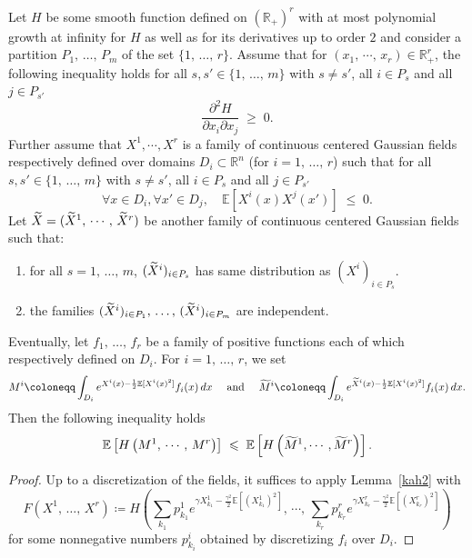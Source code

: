 \documentclass[10pt]{amsart}
\theoremstyle{definition}\newtheorem{defi}[theo]{Definition}\newtheorem{rema}[theo]{Remark}\newtheorem{exam}[theo]{Example}\newtheorem{exem}[theo]{Example}\newtheorem{nota}[theo]{Notation}
\renewcommand{\tilde}{\widetilde}
\renewcommand{\leq}{\;\leqslant\;}
\renewcommand{\geq}{\;\geqslant\;}
\newcommand{\R}{\mathbb{R}}
\newcommand{\E}{\mathbb{E}}
\newcommand*\green[1]{#1}
\let\oldtilde\tilde
\renewcommand*{\tilde}[1]{\mathchoice{\widetilde{#1}}{\widetilde{#1}}{\oldtilde{#1}}{\oldtilde{#1}}}
\let\oldforall\forall
\renewcommand*{\forall}{\mathrel{\oldforall}}
\begin{document}
\begin{coro}\label{comparison}
Let $H$ be some smooth function defined on $(\R_+)^{r}$ with at most polynomial growth at infinity for $H$ as well as for its derivatives up to order $2$ and consider a partition $P_1,\,\dots,\,P_m$ of the set $\{1,\,\dots,\,r\}$. Assume that for $(x_1,\,\cdots,\,x_{r}) \in \R_+^{r}$, the following inequality holds for all $s,s'\in \{1,\,\dots,\,m\}$ with $s\not=s'$, all $i\in P_{s}$ and all $j\in P_{s'}$
\begin{equation*}
\frac{\partial^2 H}{\partial x_i \partial x_j } \geq 0.
\end{equation*}
Further assume that $X^1, \cdots, X^{\green r}$ is a family of continuous centered Gaussian fields respectively defined over domains $D_i\subset \R^n$ (for $i=1,\,\dots,\,{r}$) such that for all $ s,s'\in \{1,\,\dots,\,m\}$ with $s\not=s'$, all $i\in P_{s}$ and all $j\in P_{s'}$
\begin{equation*}
\forall x\in D_i,\forall x'\in D_j,\quad \E[X^i(x) X^j(x')] \leq 0.
\end{equation*}
Let $\tilde{X}=(\tilde{X}^1,\,\cdots,\,\tilde{X}^{r})$ be another family of continuous centered Gaussian fields such that:
\begin{enumerate}
\item for all $ s=1,\,\dots,\,m$, $ (\tilde{X}^i)_{i\in P_{s}} $ has same distribution as $(X^i)_{i\in P_{s}} $.
\item the families $(\tilde{X}^i)_{i\in P_1},\,\dots,\,(\tilde{X}^i)_{i\in P_m}$ are independent.
\end{enumerate}

Eventually, let $f_1,\,\dots,\,f_{r}$ be a family of positive functions each of which respectively defined on $D_i$. For $i=1,\,\dots,\,r$, we set
\[
M^i\coloneqq \int_{D_i} e^{X^i(x)-\frac{1}{2}\E[X^i(x)^2]}f_i(x)\,dx\quad \text{ and }\quad \tilde M^i\coloneqq \int_{D_i} e^{\tilde X^i(x)-\frac{1}{2}\E[X^i(x)^2] }f_i(x)\,dx.
\]
Then the following inequality holds
\begin{equation*}
\E\left[H\left(M^1,\, \cdots,\, M^{r}\right)\right] \leq \E\left[H\left(\tilde{M}^1, \cdots, \tilde{M}^{r}\right)\right].
\end{equation*}
\end{coro}

\begin{proof}
 Up to a discretization of the fields, it suffices to apply Lemma~\ref{kah2} with
\[
F\left(X^1,\,\dots,\,X^{r}\right)\coloneqq H\left(\sum_{k_1}p^1_{k_1}e^{\gamma X^1_{k_1}-\frac{\gamma^2}{2}\E\left[\left(X^1_{k_1}\right)^2\right]},\,\cdots,\,\sum_{k_{ r}}p^{r}_{k_{r}}e^{\gamma X^{r}_{k_{r}}-\frac{\gamma^2}{2}\E\left[\left(X^{r}_{k_{r}}\right)^2\right]}\right)
\]
for some nonnegative numbers $p^i_{k_i}$ obtained by discretizing $f_i$ over $D_i$.
\end{proof}
\end{document}
